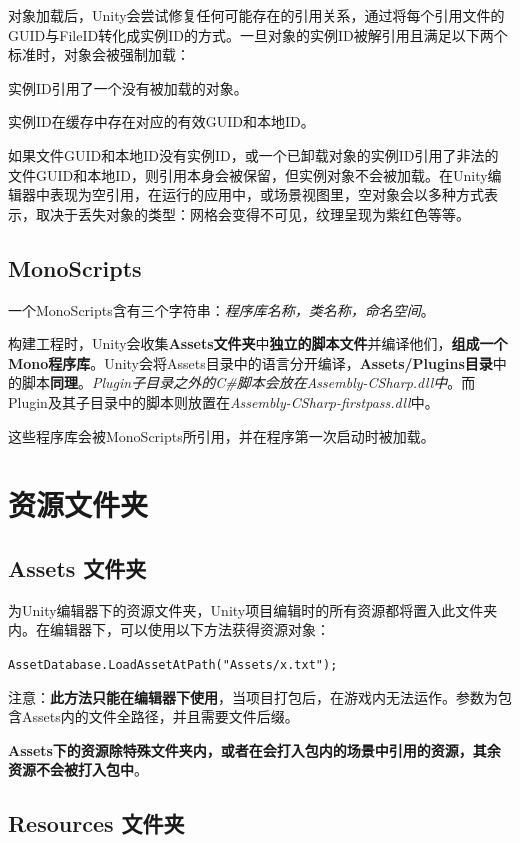\documentclass[UTF8,a4paper,12pt]{ctexbook}
\begin{document}
			对象加载后，Unity会尝试修复任何可能存在的引用关系，通过将每个引用文件的GUID与FileID转化成实例ID的方式。一旦对象的实例ID被解引用且满足以下两个标准时，对象会被强制加载：
			
	        实例ID引用了一个没有被加载的对象。
			
	        实例ID在缓存中存在对应的有效GUID和本地ID。
			
	        如果文件GUID和本地ID没有实例ID，或一个已卸载对象的实例ID引用了非法的文件GUID和本地ID，则引用本身会被保留，但实例对象不会被加载。在Unity编辑器中表现为空引用，在运行的应用中，或场景视图里，空对象会以多种方式表示，取决于丢失对象的类型：网格会变得不可见，纹理呈现为紫红色等等。
	        
		\subsection{MonoScripts}
			一个MonoScripts含有三个字符串：\textit{程序库名称，类名称，命名空间}。 
			
			构建工程时，Unity会收集\textbf{Assets文件夹}中\textbf{独立的脚本文件}并编译他们，\textbf{组成一个Mono程序库}。Unity会将Assets目录中的语言分开编译，\textbf{Assets/Plugins目录}中的脚本\textbf{同理}。\textit{Plugin子目录之外的C\#脚本会放在Assembly-CSharp.dll中}。而Plugin及其子目录中的脚本则放置在\textit{Assembly-CSharp-firstpass.dll}中。 
			
			这些程序库会被MonoScripts所引用，并在程序第一次启动时被加载。
	
	\section{资源文件夹}	
		\subsection{Assets 文件夹}
		
		    为Unity编辑器下的资源文件夹，Unity项目编辑时的所有资源都将置入此文件夹内。在编辑器下，可以使用以下方法获得资源对象：
			
	        \verb|AssetDatabase.LoadAssetAtPath("Assets/x.txt");| 
			
	        注意：\textbf{此方法只能在编辑器下使用}，当项目打包后，在游戏内无法运作。参数为包含Assets内的文件全路径，并且需要文件后缀。 
			
	        \color{blue}\textbf{Assets下的资源除特殊文件夹内，或者在会打入包内的场景中引用的资源，其余资源不会被打入包中}。\color{black}
	        
		\subsection{Resources 文件夹}
\end{document}
